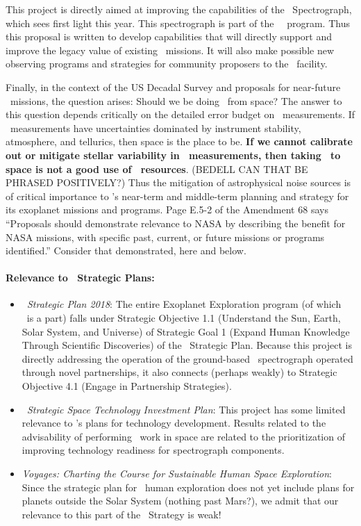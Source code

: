 \documentclass[12pt, letterpaper]{article}
\begin{document}
This project is directly aimed at improving the capabilities of the
\NEID\ Spectrograph, which sees first light this year.
This spectrograph is part of the \NASA\ \NNEXPLORE\ program.
Thus this proposal is written to develop capabilities that will
directly support and improve the legacy value of existing
\NASA\ missions.
It will also make possible new observing programs and strategies for
community proposers to the \NNEXPLORE\ facility.

Finally, in the context of the US Decadal Survey and proposals for near-future
\NASA\ missions, the question arises: Should we be doing \EPRV\ from space?
The answer to this question depends critically on the detailed error budget on
\EPRV\ measurements.
If \EPRV\ measurements have uncertainties dominated by instrument
stability, atmosphere, and tellurics, then space is the place to be.
\textbf{If we cannot calibrate out or mitigate stellar variability
  in \EPRV\ measurements, then taking
  \EPRV\ to space is not a good use of \NASA\ resources}.
(BEDELL CAN THAT BE PHRASED POSITIVELY?)
Thus the mitigation of astrophysical noise sources is of critical
importance to \NASA's near-term and middle-term planning and strategy
for its exoplanet missions and programs.
Page E.5-2 of the  Amendment 68 says ``Proposals
should demonstrate relevance to NASA by describing the benefit for
NASA missions, with specific past, current, or future missions or
programs identified.''  Consider that demonstrated, here and below.

\paragraph{Relevance to \NASA\ Strategic Plans:}
\begin{itemize}
\item
\textit{\NASA\ Strategic Plan 2018}:
The entire Exoplanet Exploration program (of which \XRP\ is a part) falls under
Strategic Objective 1.1 (Understand the Sun, Earth, Solar System, and Universe)
of Strategic Goal 1 (Expand Human Knowledge Through Scientific Discoveries) of the
\NASA\ Strategic Plan.
Because this project is directly addressing the operation of the
ground-based \NNEXPLORE\ spectrograph operated through novel
partnerships, it also connects (perhaps weakly) to Strategic Objective
4.1 (Engage in Partnership Strategies).
\item
\textit{\NASA\ Strategic Space Technology Investment Plan}:
This project has some limited relevance to \NASA's plans for technology development.
Results related to the advisability of performing \EPRV\ work in space are related to
the prioritization of improving technology readiness for spectrograph components.
\item
\textit{Voyages: Charting the Course for Sustainable Human Space
  Exploration}: Since the strategic plan for \NASA\ human exploration
does not yet include plans for planets outside the Solar System
(nothing past Mars?), we admit that our relevance to this part of the
\NASA\ Strategy is weak!
\end{itemize}
\end{document}

